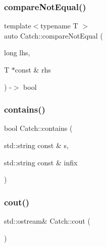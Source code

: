 \mbox{\label{namespace_catch_a3db634a0adf44a1148767ba149ccf34d}} 
\subsubsection{\texorpdfstring{compare\+Not\+Equal()}{compareNotEqual()}\hspace{0.1cm}{\footnotesize\ttfamily [5/5]}}
{\footnotesize\ttfamily template$<$typename T $>$ \\
auto Catch\+::compare\+Not\+Equal (\begin{DoxyParamCaption}\item[{long}]{lhs,  }\item[{T $\ast$const \&}]{rhs }\end{DoxyParamCaption}) -\/$>$ bool }

\mbox{\label{namespace_catch_aa52974b0e426e7e2fbd725a900e9c36e}} 
\subsubsection{\texorpdfstring{contains()}{contains()}}
{\footnotesize\ttfamily bool Catch\+::contains (\begin{DoxyParamCaption}\item[{std\+::string const \&}]{s,  }\item[{std\+::string const \&}]{infix }\end{DoxyParamCaption})}

\mbox{\label{namespace_catch_a50af73c5a37ad5c6558df4ce4a275e83}} 
\subsubsection{\texorpdfstring{cout()}{cout()}}
{\footnotesize\ttfamily std\+::ostream\& Catch\+::cout (\begin{DoxyParamCaption}{ }\end{DoxyParamCaption})}

\mbox{\label{namespace_catch_ada025504f627feaf9ac68ca391515dff}} 
